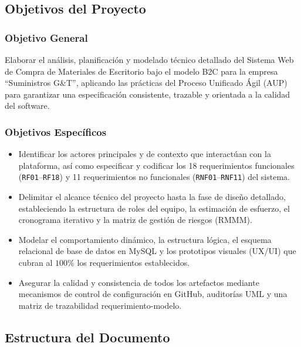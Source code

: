 \subsection{Objetivos del Proyecto}

\subsubsection{Objetivo General}
Elaborar el análisis, planificación y modelado técnico detallado del Sistema Web de Compra de Materiales de Escritorio bajo el modelo B2C para la empresa ``Suministros G\&T'', aplicando las prácticas del Proceso Unificado Ágil (AUP) para garantizar una especificación consistente, trazable y orientada a la calidad del software.

\subsubsection{Objetivos Específicos}
\begin{itemize}
    \item Identificar los actores principales y de contexto que interactúan con la plataforma, así como especificar y codificar los 18 requerimientos funcionales (\texttt{RF01}--\texttt{RF18}) y 11 requerimientos no funcionales (\texttt{RNF01}--\texttt{RNF11}) del sistema.
    \item Delimitar el alcance técnico del proyecto hasta la fase de diseño detallado, estableciendo la estructura de roles del equipo, la estimación de esfuerzo, el cronograma iterativo y la matriz de gestión de riesgos (RMMM).
    \item Modelar el comportamiento dinámico, la estructura lógica, el esquema relacional de base de datos en MySQL y los prototipos visuales (UX/UI) que cubran al $100\%$ los requerimientos establecidos.
    \item Asegurar la calidad y consistencia de todos los artefactos mediante mecanismos de control de configuración en GitHub, auditorías UML y una matriz de trazabilidad requerimiento-modelo.
\end{itemize}

\subsection{Estructura del Documento}

